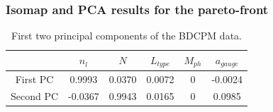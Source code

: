 \documentclass[svgnames, table, smaller]{beamer}
\begin{document}
\begin{frame}
  \frametitle{Isomap and PCA results for the pareto-front}
  
  \begin{figure}[ht]
    \begin{center}
      \label{bdcpmvars}
    \end{center}
  \end{figure}

  {\small
    \begin{table}[!ht]
      \centering
      \begin{tabular}{c|c|c|c|c|c|}
        \cline{2-6}
        & $n_l$ & $N$ & $ L_{type} $  & $ M_{ph}$ & $a_{gauge}$ \\
        \hline
        \multicolumn{1}{|c|}{First PC} & 0.9993 & 0.0370 & 0.0072 & 0 & -0.0024\\
        \hline
        \multicolumn{1}{|c|}{Second PC} & -0.0367 & 0.9943 & 0.0165 & 0 & 0.0985\\
        \hline
      \end{tabular}
      \caption{First two principal components of the BDCPM data.}
      \label{first2BDPCs}
    \end{table}
  }



 

\end{frame}
\end{document}
